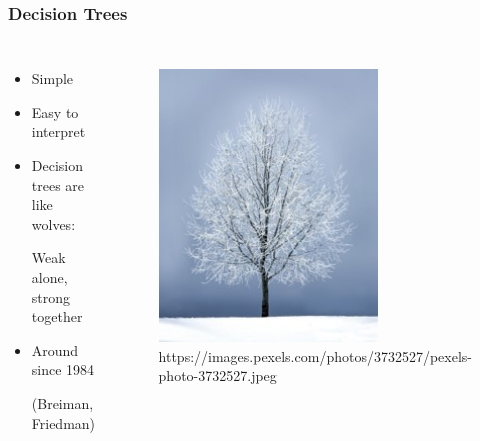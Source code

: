 \begin{frame}
	\frametitle{Decision Trees}
	\begin{columns}[onlytextwidth]
		\begin{itemize}
			\item Simple		
			\item Easy to interpret
			\item Decision trees are like wolves:
			
			Weak alone, strong together
			\item Around since 1984 
			
			(Breiman, Friedman)
		\end{itemize}
		
		\begin{figure}
			\includegraphics[width=0.7\textwidth]{pics/real_tree.jpg}
			\tiny{https://images.pexels.com/photos/3732527/pexels-photo-3732527.jpeg}
		\end{figure}
	\end{columns}
\end{frame}


